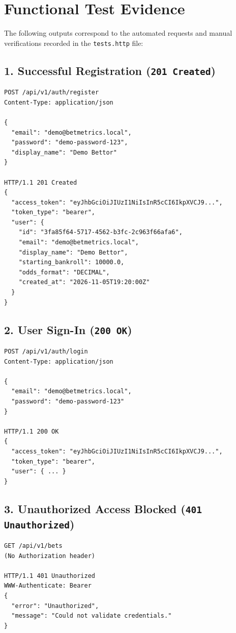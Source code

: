 \documentclass[11pt,a4paper]{article}
\begin{document}
\section{Functional Test Evidence}

The following outputs correspond to the automated requests and manual verifications recorded in the \texttt{tests.http} file:

\subsection{1. Successful Registration (\texttt{201 Created})}
\begin{lstlisting}
POST /api/v1/auth/register
Content-Type: application/json

{
  "email": "demo@betmetrics.local",
  "password": "demo-password-123",
  "display_name": "Demo Bettor"
}

HTTP/1.1 201 Created
{
  "access_token": "eyJhbGciOiJIUzI1NiIsInR5cCI6IkpXVCJ9...",
  "token_type": "bearer",
  "user": {
    "id": "3fa85f64-5717-4562-b3fc-2c963f66afa6",
    "email": "demo@betmetrics.local",
    "display_name": "Demo Bettor",
    "starting_bankroll": 10000.0,
    "odds_format": "DECIMAL",
    "created_at": "2026-11-05T19:20:00Z"
  }
}
\end{lstlisting}

\subsection{2. User Sign-In (\texttt{200 OK})}
\begin{lstlisting}
POST /api/v1/auth/login
Content-Type: application/json

{
  "email": "demo@betmetrics.local",
  "password": "demo-password-123"
}

HTTP/1.1 200 OK
{
  "access_token": "eyJhbGciOiJIUzI1NiIsInR5cCI6IkpXVCJ9...",
  "token_type": "bearer",
  "user": { ... }
}
\end{lstlisting}

\subsection{3. Unauthorized Access Blocked (\texttt{401 Unauthorized})}
\begin{lstlisting}
GET /api/v1/bets
(No Authorization header)

HTTP/1.1 401 Unauthorized
WWW-Authenticate: Bearer
{
  "error": "Unauthorized",
  "message": "Could not validate credentials."
}
\end{lstlisting}
\end{document}
